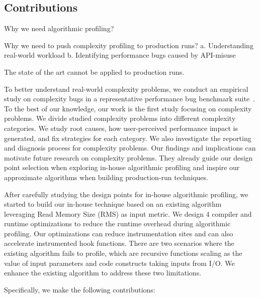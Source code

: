 \subsection{Contributions}
\label{sec:con}


Why we need algorithmic profiling? 

Why we need to push complexity profiling to production runs? 
a. Understanding real-world workload
b. Identifying performance bugs caused by API-misuse

The state of the art cannot be applied to production runs. 

To better understand real-world complexity problems,
we conduct an empirical study on complexity bugs 
in a representative performance bug benchmark suite~\cite{PerfBug,SongOOPSLA2014}.
To the best of our knowledge, our work is the first study focusing on complexity problems.
We divide studied complexity problems into different complexity categories.    
We study root causes, how user-perceived performance impact is generated, 
and fix strategies for each category.
We also investigate the reporting and diagnosis process for complexity problems. 
Our findings and implications can motivate future research on complexity problems. 
They already guide our design point selection when exploring in-house algorithmic profiling 
and inspire our approximate algorithms when building production-run techniques. 

After carefully studying the design points for in-house algorithmic profiling,
we started to build our in-house technique 
based on an existing algorithm~\cite{Aprof1,Aprof2} leveraging 
Read Memory Size (RMS) as input metric. 
We design 4 compiler and runtime optimizations 
to reduce the runtime overhead during algorithmic profiling.
Our optimizations can reduce instrumentation sites 
and can also accelerate instrumented hook functions. 
There are two scenarios where the existing algorithm fails to profile, 
which are recursive functions scaling as the value of input parameters 
and code constructs taking inputs from I/O.
We enhance the existing algorithm to address these two limitations. 




Specifically, we make the following contributions:

